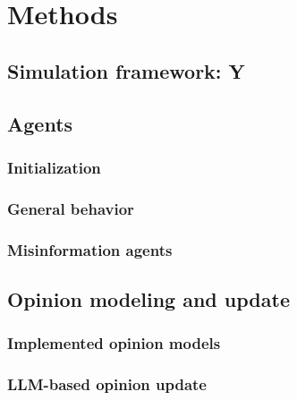 \section{Methods}
\label{sec:methods}


\subsection{Simulation framework: Y}

\subsection{Agents}
\subsubsection{Initialization}

\subsubsection{General behavior}

\subsubsection{Misinformation agents}

\subsection{Opinion modeling and update}
\subsubsection{Implemented opinion models}

\subsubsection{LLM-based opinion update}
